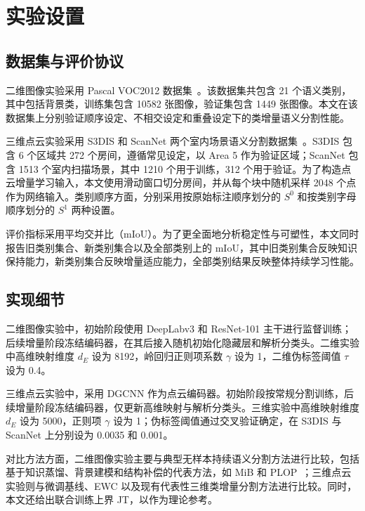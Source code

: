 \section{实验设置}

\subsection{数据集与评价协议}

二维图像实验采用 Pascal VOC2012 数据集~\citep{everingham2010voc}。该数据集共包含 21 个语义类别，其中包括背景类，训练集包含 10582 张图像，验证集包含 1449 张图像。本文在该数据集上分别验证顺序设定、不相交设定和重叠设定下的类增量语义分割性能。

三维点云实验采用 S3DIS 和 ScanNet 两个室内场景语义分割数据集~\citep{armeni2016s3dis,dai2017scannet}。S3DIS 包含 6 个区域共 272 个房间，遵循常见设定，以 Area 5 作为验证区域；ScanNet 包含 1513 个室内扫描场景，其中 1210 个用于训练，312 个用于验证。为了构造点云增量学习输入，本文使用滑动窗口切分房间，并从每个块中随机采样 2048 个点作为网络输入。类别顺序方面，分别采用按原始标注顺序划分的 $S^0$ 和按类别字母顺序划分的 $S^1$ 两种设置。

评价指标采用平均交并比（mIoU）。为了更全面地分析稳定性与可塑性，本文同时报告旧类别集合、新类别集合以及全部类别上的 mIoU，其中旧类别集合反映知识保持能力，新类别集合反映增量适应能力，全部类别结果反映整体持续学习性能。

\subsection{实现细节}

二维图像实验中，初始阶段使用 DeepLabv3 和 ResNet-101 主干进行监督训练；后续增量阶段冻结编码器，在其后接入随机初始化隐藏层和解析分类头。二维实验中高维映射维度 $d_E$ 设为 8192，岭回归正则项系数 $\gamma$ 设为 1，二维伪标签阈值 $\tau$ 设为 0.4。

三维点云实验中，采用 DGCNN 作为点云编码器。初始阶段按常规分割训练，后续增量阶段冻结编码器，仅更新高维映射与解析分类头。三维实验中高维映射维度 $d_E$ 设为 5000，正则项 $\gamma$ 设为 1；伪标签阈值通过交叉验证确定，在 S3DIS 与 ScanNet 上分别设为 0.0035 和 0.001。

对比方法方面，二维图像实验主要与典型无样本持续语义分割方法进行比较，包括基于知识蒸馏、背景建模和结构补偿的代表方法，如 MiB 和 PLOP~\citep{cermelli2020mib,douillard2021plop}；三维点云实验则与微调基线、EWC 以及现有代表性三维类增量分割方法进行比较。同时，本文还给出联合训练上界 JT，以作为理论参考。

